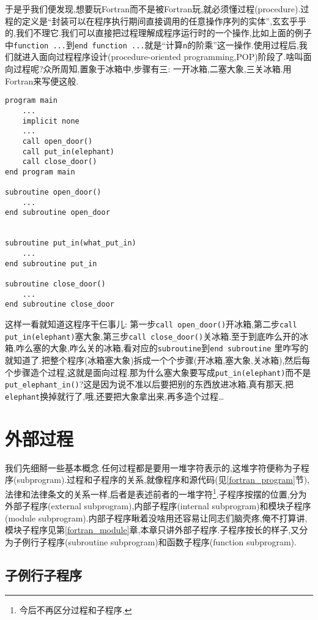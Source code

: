 于是乎我们便发现,想要玩Fortran而不是被Fortran玩,就必须懂过程(procedure).过程的定义是``封装可以在程序执行期间直接调用的任意操作序列的实体'',玄玄乎乎的,我们不理它.我们可以直接把过程理解成程序运行时的一个操作,比如上面的例子中\texttt{function ...}到\texttt{end function ...}就是``计算\texttt{n}的阶乘''这一操作.使用过程后,我们就进入面向过程程序设计(procedure-oriented programming,POP)阶段了.啥叫面向过程呢?众所周知,置象于冰箱中,步骤有三: 一开冰箱,二塞大象,三关冰箱.用Fortran来写便这般.
\begin{lstlisting}
program main
    ...
    implicit none
    ...
    call open_door()
    call put_in(elephant)
    call close_door()
end program main

subroutine open_door()
    ...
end subroutine open_door


subroutine put_in(what_put_in)
    ...
end subroutine put_in

subroutine close_door()
    ...
end subroutine close_door
\end{lstlisting}
这样一看就知道这程序干仨事儿: 第一步\texttt{call open\_{}door()}开冰箱,第二步\texttt{call put\_{}in(elephant)}塞大象,第三步\texttt{call close\_{}door()}关冰箱.至于到底咋么开的冰箱,咋么塞的大象,咋么关的冰箱,看对应的\texttt{subroutine}到\texttt{end subroutine}
里咋写的就知道了.把整个程序(冰箱塞大象)拆成一个个步骤(开冰箱,塞大象,关冰箱),然后每个步骤造个过程,这就是面向过程.那为什么塞大象要写成\texttt{put\_{}in(elephant)}而不是\texttt{put\_{}elephant\_{}in()}?这是因为说不准以后要把别的东西放进冰箱,真有那天,把\texttt{elephant}换掉就行了,哦,还要把大象拿出来,再多造个过程\dots

\section{外部过程}

我们先细掰一些基本概念.任何过程都是要用一堆字符表示的,这堆字符便称为子程序(subprogram).过程和子程序的关系,就像程序和源代码(见\ref{fortran_program}节),法律和法律条文的关系一样,后者是表述前者的一堆字符\footnote{今后不再区分过程和子程序.}.子程序按摆的位置,分为外部子程序(external subprogram),内部子程序(internal subprogram)和模块子程序(module subprogram).内部子程序瞅着没啥用还容易让同志们脑壳疼,俺不打算讲,模块子程序见第\ref{fortran_module}章,本章只讲外部子程序.子程序按长的样子,又分为子例行子程序(subroutine subprogram)和函数子程序(function subprogram).

\subsection{子例行子程序}

